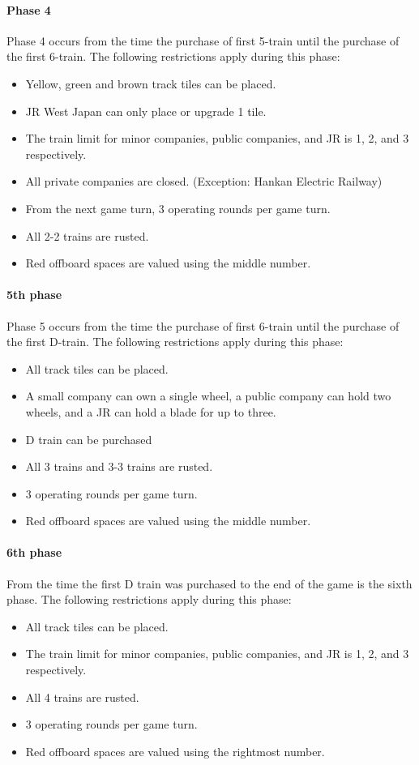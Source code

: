\documentclass{article}
\begin{document}
\begin{CJK}{UTF8}{min}
\paragraph*{Phase 4}
Phase 4 occurs from the time the purchase of first 5-train until the
purchase of the first 6-train. The following restrictions apply during
this phase:
\begin{itemize}
\item Yellow, green and brown track tiles can be placed.
\item JR West Japan can only place or upgrade 1 tile.
\item The train limit for minor companies, public companies, and JR is
  1, 2, and 3 respectively.
\item All private companies are closed. (Exception: Hankan Electric Railway)
\item From the next game turn, 3 operating rounds per game turn.
\item All 2-2 trains are rusted.
\item Red offboard spaces are valued using the middle number.
\end{itemize}

\paragraph*{5th phase}
Phase 5 occurs from the time the purchase of first 6-train until the
purchase of the first D-train. The following restrictions apply during
this phase:
\begin{itemize}
\item All track tiles can be placed.
\item A small company can own a single wheel, a public company can
  hold two wheels, and a JR can hold a blade for up to three.
\item D train can be purchased
\item All 3 trains and 3-3 trains are rusted.
\item 3 operating rounds per game turn.
\item Red offboard spaces are valued using the middle number.
\end{itemize}

\paragraph*{6th phase}
From the time the first D train was purchased to the end of the game
is the sixth phase. The following restrictions apply during this
phase:
\begin{itemize}
\item All track tiles can be placed.
\item The train limit for minor companies, public companies, and JR is
  1, 2, and 3 respectively.
\item All 4 trains are rusted.
\item 3 operating rounds per game turn.
\item Red offboard spaces are valued using the rightmost number.
\end{itemize}


\end{CJK}
\end{document}
